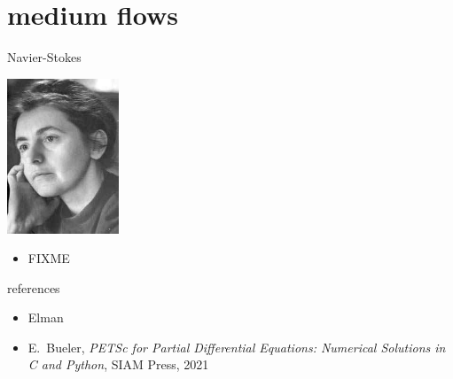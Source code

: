 \documentclass[10pt,hyperref,dvipsnames]{beamer}
\begin{document}
\section{medium flows}

\begin{frame}{Navier-Stokes}

\hfill \includegraphics[width=0.25\textwidth]{figs/people/oladyzhenskaya.jpg}

\vspace{-20mm}
\begin{itemize}
\item FIXME
\end{itemize}
\end{frame}


\begin{frame}{references}
\begin{itemize}
\item Elman
\item E.~Bueler, \emph{PETSc for Partial Differential Equations: Numerical Solutions in C and Python}, SIAM Press, 2021
\end{itemize}
\end{frame}
\end{document}
